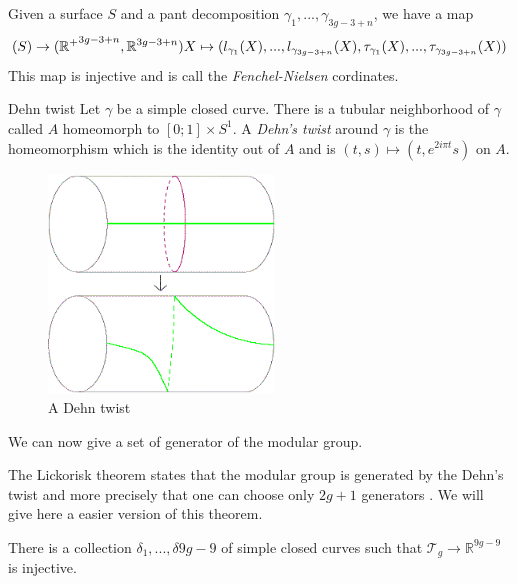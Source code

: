 \begin{dfnt}
Given a surface $S$ and a pant decomposition $\gamma_1,...,\gamma_{3g-3+n}$, we have a map \[
\mathcal(S) \rightarrow (\mathbb{R^{+}}^{3g-3+n},\mathbb{R}^{3g-3+n}) \\
X \mapsto (l_{\gamma_1}(X),...,l_{\gamma_{3g-3+n}}(X),\tau_{\gamma_1}(X),...,\tau_{\gamma_{3g-3+n}}(X))
\]
This map is injective and is call the \emph{Fenchel-Nielsen} cordinates.
\end{dfnt}

\begin{dfnt}{Dehn twist}
Let $\gamma$ be a simple closed curve. There is a tubular neighborhood of $\gamma$ called $A$ homeomorph to $[0;1] \times S^{1}$.
A \emph{Dehn's twist} around $\gamma$ is the homeomorphism which is the identity out of $A$ and is $(t,s) \mapsto (t,e^{2i \pi t} s)$ on $A$.
\end{dfnt}

\begin{figure}[!h]
\centering
\includegraphics[width=6cm]{Image/Dehn_twist.png}
\caption{A Dehn twist}
\end{figure}

We can now give a set of generator of the modular group.

\begin{rmq}
The Lickorisk theorem states that the modular group is generated by the Dehn's twist and more precisely that one can choose only $2g+1$ generators \cite{Lickorish1964AFS}. We will give here a easier version of this theorem.
\end{rmq}

\begin{thm}
There is a collection $\delta_{1},...,\delta{9g-9}$ of simple closed curves such that $\mathcal{T}_{g} \to \mathbb{R}^{9g-9}$ is injective.
\end{thm}

